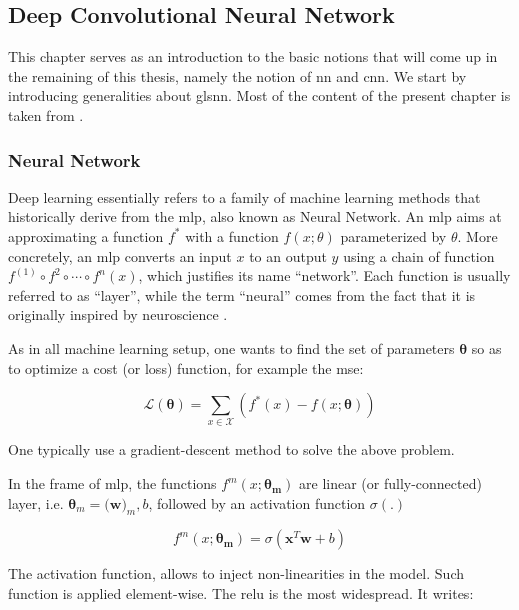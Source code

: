 \subsection{Deep Convolutional Neural Network}
\label{sec:cnn}

This chapter serves as an introduction to the basic notions that will come up in the remaining of this thesis, namely the notion of \gls{nn} and \gls{cnn}.
We start by introducing generalities about gls{nn}.
Most of the content of the present chapter is taken from \cite{goodfellow16}.

\subsubsection{Neural Network}
Deep learning essentially refers to a family of machine learning methods that historically derive from the \gls{mlp}, also known as Neural Network.
An \gls{mlp} aims at approximating a function $f^{*}$ with a function $f(x;\theta)$ parameterized by $\theta$.
More concretely, an \gls{mlp} converts an input $x$ to an output $y$ using a chain of function $f^{(1)} \circ f^{2} \circ \cdots \circ f^{n}(x)$, which justifies its name ``network''.
Each function is usually referred to as ``layer'', while the term ``neural'' comes from the fact that it is originally inspired by neuroscience \cite{mcculloch43}.

As in all machine learning setup, one wants to find the set of parameters $\bm{\theta}$ so as to optimize a cost (or loss) function, for example the \gls{mse}:

\begin{equation}
\mathcal{L}(\bm{\theta}) = \sum_{x\in \mathcal{X}}(f^{*}(x)-f(x;\bm{\theta}))
\end{equation}

One typically use a gradient-descent method to solve the above problem.

In the frame of \gls{mlp}, the functions $f^{m}(x;\bm{\theta_{m}})$ are linear (or fully-connected) layer, i.e. $\bm{\theta}_m=(\bm{w)}_{m},b$, followed by an activation function $\sigma(.)$

\begin{equation}
f^{m}(x;\bm{\theta_{m}}) = \sigma(\bm{x}^{T}\bm{w} + b)
\end{equation}

The activation function, allows to inject non-linearities in the model.
Such function is applied element-wise.
The \gls{relu} is the most widespread.
It writes:

